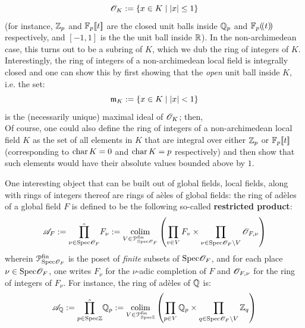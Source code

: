 \begin{example}
\begin{enumerate}
                            $$\mathscr{O}_K := \{x \in K \mid |x| \leq 1\}$$
                        (for instance, $\mathbb{Z}_p$ and $\mathbb{F}_p[\![t]\!]$ are the closed unit balls inside $\mathbb{Q}_p$ and $\mathbb{F}_p(\!(t)\!)$ respectively, and $[-1, 1]$ is the the unit ball inside $\mathbb{R}$). In the non-archimedean case, this turns out to be a subring of $K$, which we dub the ring of integers of $K$. Interestingly, the ring of integers of a non-archimedean local field is integrally closed and one can show this by first showing that the \textit{open} unit ball inside $K$, i.e. the set:
                            $$\mathfrak{m}_K := \{x \in K \mid |x| < 1\}$$
                        is the (necessarily unique) maximal ideal of $\mathscr{O}_K$; then, 
                        \\
                        Of course, one could also define the ring of integers of a non-archimedean local field $K$ as the set of all elements in $K$ that are integral over either $\mathbb{Z}_p$ or $\mathbb{F}_p[\![t]\!]$ (corresponding to $\operatorname{char} K = 0$ and $\operatorname{char} K = p$ respectively) and then show that such elements would have their absolute values bounded above by $1$. 
                    \end{enumerate}
                    
                    One interesting object that can be built out of global fields, local fields, along with rings of integers thereof are rings of a\`eles of global fields: the ring of ad\`eles of a global field $F$ is defined to be the following so-called \textbf{restricted product}:
                        $$\scrA_F := \hat{\prod_{\nu \in \Spec \scrO_F}} F_{\nu} := \underset{V \in \calP^{\fin}_{\Spec \scrO_F}}{\colim} \left(\prod_{v \in V} F_v \x \prod_{\nu \in \Spec \scrO_F \setminus V} \scrO_{F, \nu}\right)$$
                    wherein $\mathcal{P}^{\mathrm{fin}}_{\mathrm{Spec} \mathscr{O}_F}$ is the poset of \textit{finite} subsets of $\mathrm{Spec} \mathscr{O}_F$, and for each place $\nu \in \mathrm{Spec} \mathscr{O}_F$, one writes $F_{\nu}$ for the $\nu$-adic completion of $F$ and $\mathscr{O}_{F, \nu}$ for the ring of integers of $F_{\nu}$. For instance, the ring of ad\`eles of $\mathbb{Q}$ is:
                        $$\scrA_{\Q} := \hat{\prod_{p \in \Spec \Z}} \Q_p := \underset{V \in \calP^{\fin}_{\Spec \Z}}{\colim} \left(\prod_{p \in V} \Q_p \x \prod_{q \in \Spec \scrO_F \setminus V} \Z_q\right)$$
                \end{example}
